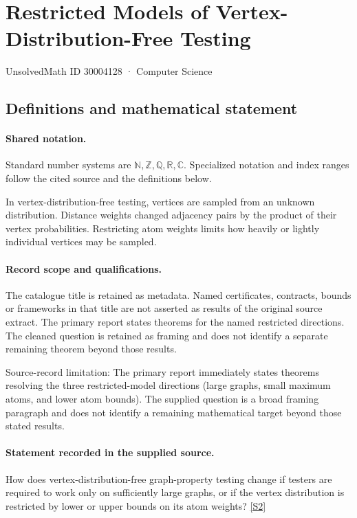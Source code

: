 \documentclass[11pt]{article}
\newcommand{\sref}[2]{\hyperlink{source:#1:#2}{[S#2]}}
\begin{document}
\setcounter{section}{30004127}
\section{Restricted Models of Vertex-Distribution-Free Testing}\label{30004128}
{\small\sffamily UnsolvedMath ID 30004128 · Computer Science}
\subsection{Definitions and mathematical statement}

\paragraph{Shared notation.}Standard number systems are $\mathbb N,\mathbb Z,\mathbb Q,\mathbb R,\mathbb C$. Specialized notation and index ranges follow the cited source and the definitions below.


In vertex-distribution-free testing, vertices are sampled from an unknown distribution. Distance weights changed adjacency pairs by the product of their vertex probabilities. Restricting atom weights limits how heavily or lightly individual vertices may be sampled.
\paragraph{Record scope and qualifications.}
The catalogue title is retained as metadata. Named certificates, contracts, bounds or frameworks in that title are not asserted as results of the original source extract.
The primary report states theorems for the named restricted directions. The cleaned question is retained as framing and does not identify a separate remaining theorem beyond those results.

Source-record limitation: The primary report immediately states theorems resolving the three restricted-model directions (large graphs, small maximum atoms, and lower atom bounds). The supplied question is a broad framing paragraph and does not identify a remaining mathematical target beyond those stated results.
\paragraph{Statement recorded in the supplied source.}
How does vertex-distribution-free graph-property testing change if testers are required to work only on sufficiently large graphs, or if the vertex distribution is restricted by lower or upper bounds on its atom weights? \sref{30004128}{2}
\end{document}
